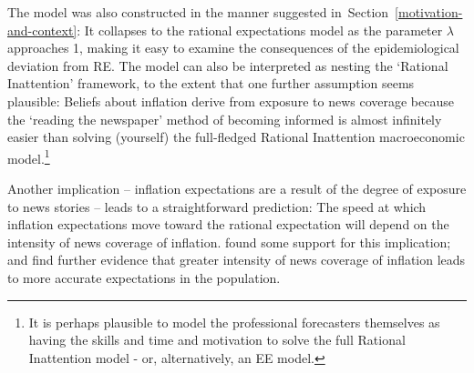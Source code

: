 The model was also constructed in the manner suggested in~Section~\ref{motivation-and-context}: It collapses to the rational expectations model as the parameter $\lambda$ approaches 1, making it easy to examine the consequences of the epidemiological deviation from RE.  The model can also be interpreted as nesting the `Rational Inattention' framework, to the extent that one further assumption seems plausible:  Beliefs about inflation derive from exposure to news coverage because the `reading the newspaper' method of becoming informed is almost infinitely easier than solving (yourself) the full-fledged Rational Inattention macroeconomic model.\footnote{It is perhaps plausible to model the professional forecasters themselves as having the skills and time and motivation to solve the full Rational Inattention model - or, alternatively, an EE model.}

Another implication -- inflation expectations are a result of the degree of exposure to news stories -- leads to a straightforward prediction:  The speed at which inflation expectations move toward the rational expectation will depend on the intensity of news coverage of inflation.  \cite{carroll2003macroeconomic} found some support for this implication; \cite{lamla2014role} and \cite{larsen2021news} find further evidence that greater intensity of news coverage of inflation leads to more accurate expectations in the population.  %





